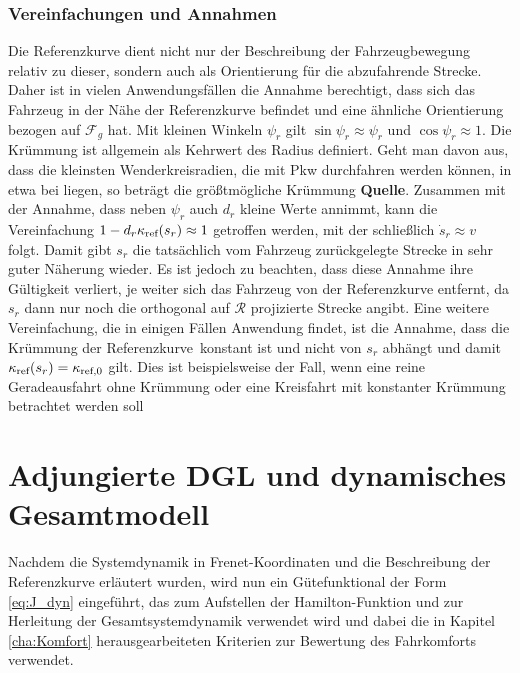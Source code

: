 \subsubsection{Vereinfachungen und Annahmen}\label{subsubsec:Vereinfachungen}
Die Referenzkurve dient nicht nur der Beschreibung der Fahrzeugbewegung relativ zu dieser, sondern auch als Orientierung für die abzufahrende Strecke. Daher ist in vielen Anwendungsfällen die Annahme berechtigt, dass sich das Fahrzeug in der Nähe der Referenzkurve befindet und eine ähnliche Orientierung bezogen auf $\mathcal{F}_g$ hat. Mit kleinen Winkeln $\psi_r$ gilt $\sin{\psi_r}\approx\psi_r$ und $\cos{\psi_r}\approx 1$. Die Krümmung ist allgemein als Kehrwert des Radius definiert. Geht man davon aus, dass die kleinsten Wenderkreisradien, die mit Pkw durchfahren werden können, in etwa bei  liegen, so beträgt die größtmögliche Krümmung  \textbf{Quelle}. Zusammen mit der Annahme, dass neben $\psi_r$ auch $d_r$ kleine Werte annimmt, kann die Vereinfachung $1-d_r\kappa_{\textrm{ref}}(s_r)\approx 1$ getroffen werden, mit der schließlich $\dot{s}_r\approx v$ folgt. Damit gibt $s_r$ die tatsächlich vom Fahrzeug zurückgelegte Strecke in sehr guter Näherung wieder. Es ist jedoch zu beachten, dass diese Annahme ihre Gültigkeit verliert, je weiter sich das Fahrzeug von der Referenzkurve entfernt, da $s_r$ dann nur noch die orthogonal auf $\mathcal{R}$ projizierte Strecke angibt. Eine weitere Vereinfachung, die in einigen Fällen Anwendung findet, ist die Annahme, dass die Krümmung der Referenzkurve \kapparefofs\,konstant ist und nicht von $s_r$ abhängt und damit $\kappa_{\textrm{ref}}(s_r)=\kappa_{\textrm{ref},0}$ gilt. Dies ist beispielsweise der Fall, wenn eine reine Geradeausfahrt ohne Krümmung oder eine Kreisfahrt mit konstanter Krümmung betrachtet werden soll

\section{Adjungierte \gls{DGL} und dynamisches Gesamtmodell}\label{sec:Systemdynamik}
Nachdem die Systemdynamik in Frenet-Koordinaten und die Beschreibung der Referenzkurve erläutert wurden, wird nun ein Gütefunktional der Form \eqref{eq:J_dyn} eingeführt, das zum Aufstellen der Hamilton-Funktion und zur Herleitung der Gesamtsystemdynamik verwendet wird und dabei die in Kapitel \ref{cha:Komfort} herausgearbeiteten Kriterien zur Bewertung des Fahrkomforts verwendet.

